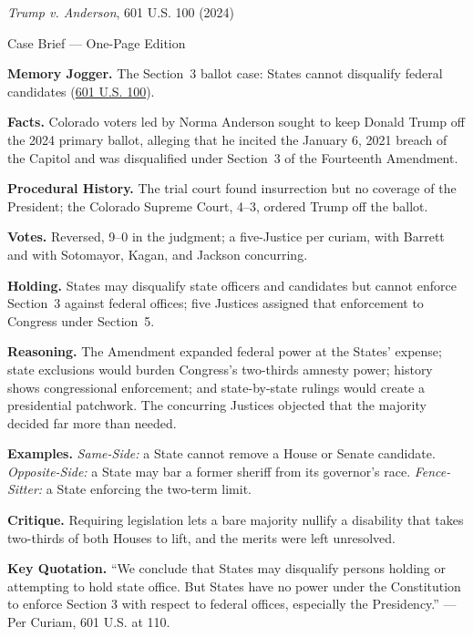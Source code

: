 \documentclass[12pt]{article}
\begin{document}
\begin{center}
{\Large \textit{Trump v. Anderson}, 601 U.S. 100 (2024)\par}
\vspace{0.3em}
{\normalsize Case Brief --- One-Page Edition\par}
\end{center}

\textbf{Memory Jogger.} The Section~3 ballot case: States cannot disqualify federal candidates (\href{https://www.supremecourt.gov/opinions/23pdf/601us1r06_m6hn.pdf}{601 U.S. 100}).

\textbf{Facts.} Colorado voters led by Norma Anderson sought to keep Donald Trump off the 2024 primary ballot, alleging that he incited the January 6, 2021 breach of the Capitol and was disqualified under Section~3 of the Fourteenth Amendment.

\textbf{Procedural History.} The trial court found insurrection but no coverage of the President; the Colorado Supreme Court, 4--3, ordered Trump off the ballot.

\textbf{Votes.} Reversed, 9--0 in the judgment; a five-Justice per curiam, with Barrett and with Sotomayor, Kagan, and Jackson concurring.

\textbf{Holding.} States may disqualify state officers and candidates but cannot enforce Section~3 against federal offices; five Justices assigned that enforcement to Congress under Section~5.

\textbf{Reasoning.} The Amendment expanded federal power at the States' expense; state exclusions would burden Congress's two-thirds amnesty power; history shows congressional enforcement; and state-by-state rulings would create a presidential patchwork. The concurring Justices objected that the majority decided far more than needed.

\textbf{Examples.} \emph{Same-Side:} a State cannot remove a House or Senate candidate. \emph{Opposite-Side:} a State may bar a former sheriff from its governor's race. \emph{Fence-Sitter:} a State enforcing the two-term limit.

\textbf{Critique.} Requiring legislation lets a bare majority nullify a disability that takes two-thirds of both Houses to lift, and the merits were left unresolved.

\textbf{Key Quotation.} ``We conclude that States may disqualify persons holding or attempting to hold state office. But States have no power under the Constitution to enforce Section 3 with respect to federal offices, especially the Presidency.'' --- Per Curiam, 601 U.S. at 110.
\end{document}

